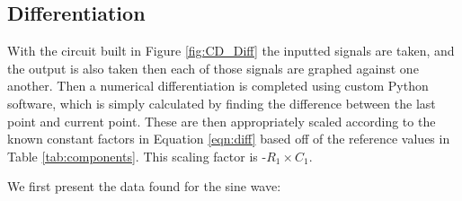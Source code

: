 \subsection{Differentiation}

With the circuit built in Figure \ref{fig:CD_Diff} the inputted signals are taken, and the output is also taken then each of those signals are graphed against one another. Then a numerical differentiation is completed using custom Python software, which is simply calculated by finding the difference between the last point and current point. These are then appropriately scaled according to the known constant factors in Equation \ref{eqn:diff} based off of the reference values in Table \ref{tab:components}. This scaling factor is -$R_1 \times C_1$.

We first present the data found for the sine wave:

